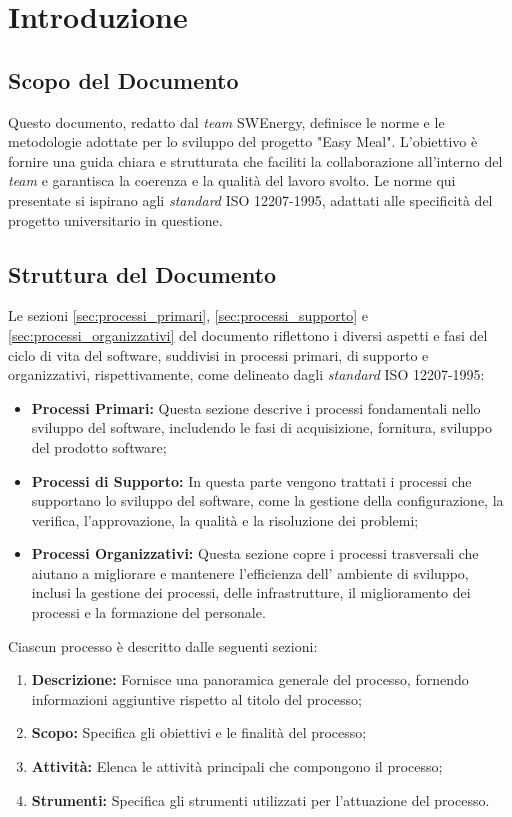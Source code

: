 \section{Introduzione}

\subsection{Scopo del Documento}
Questo documento, redatto dal \textit{team} SWEnergy, definisce le norme e le
metodologie adottate per lo sviluppo del progetto "Easy Meal". L'obiettivo è
fornire una guida chiara e strutturata che faciliti la collaborazione all'interno
del \textit{team} e garantisca la coerenza e la qualità del lavoro svolto. Le
norme qui presentate si ispirano agli \textit{standard} ISO 12207-1995, adattati alle
specificità del progetto universitario in questione.

\subsection{Struttura del Documento}
Le sezioni \cref{sec:processi_primari}, \cref{sec:processi_supporto} e \cref{sec:processi_organizzativi} del documento riflettono i diversi aspetti e fasi del ciclo di vita del software, suddivisi in processi primari, di supporto e organizzativi, rispettivamente, come delineato dagli \textit{standard} ISO 12207-1995:

\begin{itemize}
	\item \textbf{Processi Primari:} Questa sezione descrive i processi
	      fondamentali nello sviluppo del software, includendo le fasi di
	      acquisizione, fornitura, sviluppo del prodotto software;
	\item \textbf{Processi di Supporto:} In questa parte vengono trattati i
	      processi che supportano lo sviluppo del software, come la gestione
	      della configurazione, la verifica, l'approvazione, la qualità e la
	      risoluzione dei problemi;
	\item \textbf{Processi Organizzativi:} Questa sezione copre i processi
	      trasversali che aiutano a migliorare e mantenere l'efficienza dell'
	      ambiente di sviluppo, inclusi la gestione dei processi, delle
	      infrastrutture, il miglioramento dei processi e la formazione del
	      personale.
\end{itemize}

Ciascun processo è descritto dalle seguenti sezioni:
\begin{enumerate}
	\item \textbf{Descrizione:} Fornisce una panoramica generale del processo,
	      fornendo informazioni aggiuntive rispetto al titolo del processo;
	\item \textbf{Scopo:} Specifica gli obiettivi e le finalità del processo;
	\item \textbf{Attività:} Elenca le attività principali che compongono il
	      processo;
	\item \textbf{Strumenti:} Specifica gli strumenti utilizzati per
	      l'attuazione del processo.
\end{enumerate}

